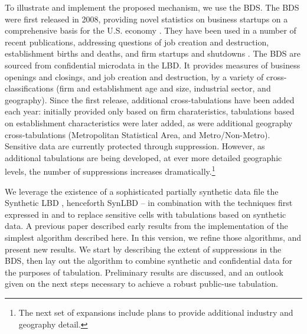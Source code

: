 To illustrate and implement the proposed mechanism, we use the \acf{BDS}. The \ac{BDS} were 
first released in 
2008, providing novel statistics on business startups on a comprehensive basis for the U.S. 
economy \cite{BDS2}. They have been used in a number of recent publications, addressing %
questions of  job creation and destruction, establishment births and deaths, and firm startups and shutdowns %
\cite{NBERw16300,RePEc:bin:bpeajo:v:43:y:2011:i:2011-02:p:73-142,10.1257/jep.28.3.3,pugsley2014grown}. 
The \ac{BDS} are sourced from confidential microdata in the \acf{LBD}. It
provides measures of business openings and closings, and job creation and destruction, by a variety of cross-classifications (firm and establishment age and size, industrial sector, and geography).
Since the first release, additional cross-tabulations have been added each year: initially provided 
only based on  firm charateristics, tabulations based on establishment characteristics were later 
added, as were additional geography cross-tabulations (Metropolitan Statistical Area, and 
Metro/Non-Metro).  Sensitive data are currently protected through suppression. However, as 
additional tabulations are being developed, at ever more detailed geographic levels, the number 
of suppressions increases dramatically.\footnote{The next set of expansions include plans to 
provide additional industry and geography detail.}  

We leverage the existence of a sophisticated partially synthetic data file the Synthetic LBD 
\cite{SynLBD20,KinneyEtAl2011}, 
henceforth \acs{SynLBD} -- in combination with the techniques first expressed in 
\cite{Gittings2009thesis} and \cite{RePEc:bes:jnlasa:v:105:i:492:y:2010:p:1347-1357} to replace 
sensitive cells with tabulations based on synthetic 
data.  A previous paper \cite{psd2014a} described early results from the implementation of the 
simplest algorithm described here. In this version, we refine those algorithms, and present new 
results. 
We start by describing the extent of suppressions in the \ac{BDS}, then lay out the algorithm to 
combine synthetic and confidential data for the purposes of tabulation. Preliminary results are 
discussed, and an outlook given on the next steps necessary to achieve a robust public-use 
tabulation. 

